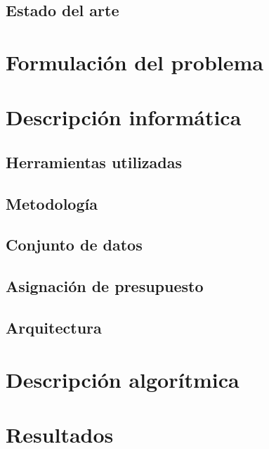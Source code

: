 \documentclass[12pt,twoside,titlepage]{report}
\newcommand\blankpage{%
    \newpage
    \null
    \thispagestyle{empty}%
    \newpage}
\begin{document}
\section{Estado del arte} \label{sec:estado_arte} 




\blankpage

\chapter{Formulación del problema} \label{chap:formulacion_problema}


\chapter{Descripción informática} \label{chap:descinf}

\section{Herramientas utilizadas} \label{sec:herramientas}


\section{Metodología} \label{sec:metodologia}

\section{Conjunto de datos} \label{sec:datos}


\section{Asignación de presupuesto} \label{sec:asignacion_presupuestos}


\section{Arquitectura} \label{sec:desc_programas}







\chapter{Descripción algorítmica} \label{chap:descalg}


\chapter{Resultados} \label{chap:resultObtenidos}
\end{document}
